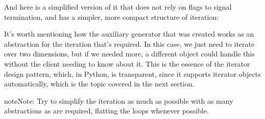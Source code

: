 \documentclass[a4paper,10pt,english]{sphinxmanual}
\begin{document}
And here is a simplified version of it that does not rely on flags to signal termination, and
has a simpler, more compact structure of iteration:

\begin{sphinxVerbatim}[commandchars=\\\{\}]
 
        
            
               

  
                   
     
         

     
\end{sphinxVerbatim}

It’s worth mentioning how the auxiliary generator that was created works as an abstraction
for the iteration that’s required. In this case, we just need to iterate over two dimensions,
but if we needed more, a different object could handle this without the client needing to
know about it. This is the essence of the iterator design pattern, which, in Python, is
transparent, since it supports iterator objects automatically, which is the topic covered in
the next section.

\begin{sphinxadmonition}{note}{Note:}
Try to simplify the iteration as much as possible with as many abstractions as are required, flatting the
loops whenever possible.
\end{sphinxadmonition}
\end{document}
